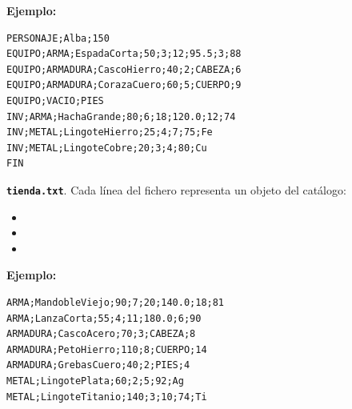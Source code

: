 \documentclass[11pt,a4paper]{article}
\begin{document}
\textbf{Ejemplo:}
{\small
\begin{verbatim}
PERSONAJE;Alba;150
EQUIPO;ARMA;EspadaCorta;50;3;12;95.5;3;88
EQUIPO;ARMADURA;CascoHierro;40;2;CABEZA;6
EQUIPO;ARMADURA;CorazaCuero;60;5;CUERPO;9
EQUIPO;VACIO;PIES
INV;ARMA;HachaGrande;80;6;18;120.0;12;74
INV;METAL;LingoteHierro;25;4;7;75;Fe
INV;METAL;LingoteCobre;20;3;4;80;Cu
FIN
\end{verbatim}
}

\textbf{\texttt{tienda.txt}}. Cada línea del fichero representa un objeto del catálogo:
\begin{itemize}[noitemsep, topsep=0pt]
    \item {}
    \item {}
    \item {}
\end{itemize}

\textbf{Ejemplo:}
{\small
\begin{verbatim}
ARMA;MandobleViejo;90;7;20;140.0;18;81
ARMA;LanzaCorta;55;4;11;180.0;6;90
ARMADURA;CascoAcero;70;3;CABEZA;8
ARMADURA;PetoHierro;110;8;CUERPO;14
ARMADURA;GrebasCuero;40;2;PIES;4
METAL;LingotePlata;60;2;5;92;Ag
METAL;LingoteTitanio;140;3;10;74;Ti
\end{verbatim}
}
\end{document}
